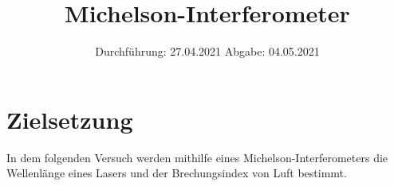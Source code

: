 
\usepackage{parskip}

\subject{V401}
\title{Michelson-Interferometer}
\date{
    Durchführung: 27.04.2021
    \hspace{3em}
    Abgabe: 04.05.2021
}



\maketitle
\thispagestyle{empty}
\tableofcontents
\newpage

\section{Zielsetzung}

    In dem folgenden Versuch werden mithilfe eines Michelson-Interferometers
    die Wellenlänge eines Lasers und der Brechungsindex von Luft bestimmt.


\clearpage


\clearpage


\clearpage


\clearpage

\printbibliography


